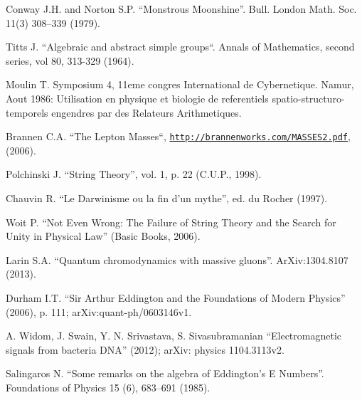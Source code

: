 \documentclass[twoside,draft]{article}
\begin{document}
\begin{sloppypar}
\begin{thebibliography}{99}
 Conway J.H. and Norton S.P. ``Monstrous Moonshine''. Bull. London
Math. Soc. 11(3) 308--339 (1979).

 Titts J. ``Algebraic and abstract simple groups``. Annals of Mathematics, second series, vol 80, 313-329 (1964).



 Moulin T. Symposium 4, 11eme congres International de Cybernetique. Namur, Aout 1986: Utilisation en physique et biologie de referentiels spatio-structuro-temporels engendres par des Relateurs Arithmetiques. 

 Brannen C.A. ``The Lepton Masses``, \href{http://brannenworks.com/MASSES2.pdf}{\texttt{http://brannenworks.com/MASSES2.pdf}}, (2006).

 Polchinski J. ``String Theory'', vol. 1, p. 22 (C.U.P., 1998).

 Chauvin R. ``Le Darwinisme ou la fin d'un mythe'', ed. du Rocher
(1997).

 Woit P. ``Not Even Wrong: The Failure of String Theory and the
Search for Unity in Physical Law'' (Basic Books, 2006).

 Larin S.A. ``Quantum chromodynamics with massive gluons''.
ArXiv:1304.8107 (2013).

 Durham I.T. ``Sir Arthur Eddington and the Foundations of Modern
Physics'' (2006), p. 111; arXiv:quant-ph/0603146v1.

 A. Widom, J. Swain, Y. N. Srivastava, S. Sivasubramanian ``Electromagnetic signals from bacteria DNA''
(2012); arXiv: physics 1104.3113v2.

 Salingaros N. ``Some remarks on the algebra of Eddington's E
Numbers''. Foundations of Physics 15 (6), 683--691 (1985).


\end{thebibliography}
\end{sloppypar}
\end{document}
